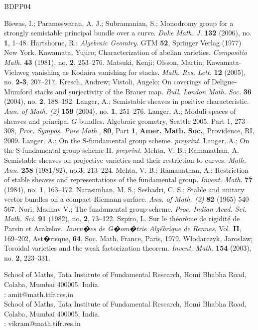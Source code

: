\documentclass[12pt,oneside]{amsart}
\theoremstyle{plain}
\theoremstyle{definition}
\begin{document}
\begin{thebibliography}{BDPP04}

Biswas, I.; Parameswaran, A. J.; Subramanian, S.; Monodromy group for a strongly semistable principal bundle over a curve. 
{\it Duke Math. J.} {\bf 132} (2006), no. {\bf 1}, 1--48. 
 Hartshorne, R.; {\it Algebraic Geomtry}. GTM {\bf 52}, Springer Verlag (1977) New York.
 Kawamata, Yujiro; Characterization of abelian varieties.  {\it Compositio Math.}  {\bf 43}  (1981), no. {\bf 2}, 253--276. 
Matsuki, Kenji; Olsson, Martin; Kawamata-Viehweg vanishing as Kodaira vanishing for stacks.  {\it Math. Res. Lett.}  {\bf 12}  (2005),  no. {\bf 2-3}, 207--217.
Kresch, Andrew; Vistoli, Angelo; On coverings of Deligne-Mumford stacks and surjectivity of the Brauer map.  {\it Bull. London Math. Soc.}  {\bf 36}  (2004),  no. {\bf 2}, 188--192.
Langer, A.; Semistable sheaves in positive characteristic.  {\it Ann. of Math. (2)}  {\bf 159}  (2004),  no. {\bf 1}, 251--276.
 Langer, A.; Moduli spaces of sheaves and principal $G$-bundles. Algebraic geometry, Seattle 2005. Part 1,  273--308, {\it Proc. Sympos. Pure Math.}, {\bf 80}, Part {\bf 1}, {\bf Amer. Math. Soc.}, Providence, RI, 2009. 
 Langer, A.; On the S-fundamental group scheme. {\it preprint}.
 Langer, A.; On the S-fundamental group scheme-II. {\it preprint}. 
 Mehta, V. B.; Ramanathan, A.
Semistable sheaves on projective varieties and their restriction to curves.
{\it Math. Ann.} {\bf 258} (1981/82), no.{\bf 3}, 213--224. 
 Mehta, V. B.; Ramanathan, A.; Restriction of stable sheaves and representations of the fundamental group.
{\it Invent. Math.} {\bf 77} (1984), no. {\bf 1}, 163--172. 
Narasimhan, M. S.; Seshadri, C. S.; Stable and unitary vector bundles on a compact Riemann surface.
{\it Ann. of Math. (2)} {\bf 82} (1965) 540--567. 
 Nori, Madhav V.; The fundamental group-scheme.
{\it Proc. Indian Acad. Sci. Math. Sci.}  {\bf 91} (1982), no. {\bf 2}, 73--122. 
 Szpiro, L. Sur le th\'eor\`eme de rigidit\'e de Parsin et Arakelov. {\it Journ�es de G�om�trie Alg\'ebrique de Rennes}, Vol. {\bf II},   169--202, Ast�risque, {\bf 64}, Soc. Math. France, Paris, 1979. 
W\l odarczyk, Jaros\l aw; Toroidal varieties and the weak factorization theorem.  {\it Invent. Math.}  {\bf 154}  (2003),  no. {\bf 2}, 223--331.

\end{thebibliography}
\vspace{3mm}
{\small 
\noindent School of Maths, Tata Institute of Fundamental Research, Homi Bhabha Road, Colaba, Mumbai 400005. India. \\
: amit@math.tifr.res.in \\ 

\noindent School of Maths, Tata Institute of Fundamental Research, Homi Bhabha Road, Colaba, Mumbai 400005. India. \\
: vikram@math.tifr.res.in \\
}

\end{document}
